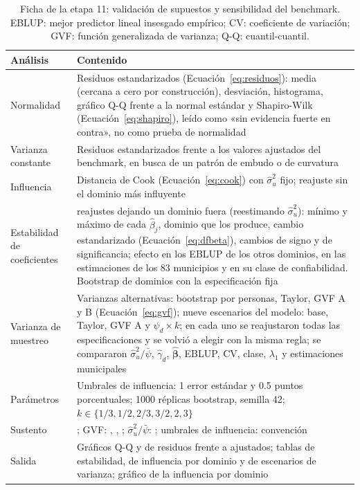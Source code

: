 \begin{table}[!htbp]
\centering
\small
\caption[Ficha de la etapa 11: validación de supuestos y sensibilidad del benchmark]{Ficha de la etapa 11: validación de supuestos y sensibilidad del benchmark. EBLUP: mejor predictor lineal insesgado empírico; CV: coeficiente de variación; GVF: función generalizada de varianza; Q-Q: cuantil-cuantil.}
\label{tab:met_supuestos}
\renewcommand{\arraystretch}{1.15}
\begin{tabularx}{\linewidth}{>{\raggedright\arraybackslash}p{2.8cm} >{\raggedright\arraybackslash}X}
\toprule
Análisis & Contenido \\
\midrule
Normalidad & Residuos estandarizados (Ecuación~\ref{eq:residuos}): media (cercana a cero por construcción), desviación, histograma, gráfico Q-Q frente a la normal estándar y Shapiro-Wilk (Ecuación~\ref{eq:shapiro}), leído como «sin evidencia fuerte en contra», no como prueba de normalidad \\
Varianza constante & Residuos estandarizados frente a los valores ajustados del benchmark, en busca de un patrón de embudo o de curvatura \\
Influencia & Distancia de Cook (Ecuación~\ref{eq:cook}) con $\hat{\sigma}_u^2$ fijo; reajuste sin el dominio más influyente \\
Estabilidad de coeficientes & 23 reajustes dejando un dominio fuera (reestimando $\hat{\sigma}_u^2$): mínimo y máximo de cada $\hat{\beta}_j$, dominio que los produce, cambio estandarizado (Ecuación~\ref{eq:dfbeta}), cambios de signo y de significancia; efecto en los EBLUP de los otros dominios, en las estimaciones de los 83 municipios y en su clase de confiabilidad. Bootstrap de dominios con la especificación fija \\
Varianza de muestreo & Varianzas alternativas: bootstrap por personas, Taylor, GVF A y B (Ecuación~\ref{eq:gvf}); nueve escenarios del modelo: base, Taylor, GVF A y $\psi_d \times k$; en cada uno se reajustaron todas las especificaciones y se volvió a elegir con la misma regla; se compararon $\hat{\sigma}_u^2/\bar{\psi}$, $\hat{\gamma}_d$, $\hat{\boldsymbol{\beta}}$, EBLUP, CV, clase, $\lambda_1$ y estimaciones municipales \\
Parámetros & Umbrales de influencia: 1 error estándar y 0.5 puntos porcentuales; \num{1000} réplicas bootstrap, semilla 42; $k \in \{1/3, 1/2, 2/3, 3/2, 2, 3\}$ \\
Sustento & \cite{ShapiroWilk1965, Cook1977}; GVF: \cite[p.~427]{morales2021smallarea}, \cite[pp.~15--16]{MarinTralmaGuerrero2024}, \cite[p.~15]{Tellez2020}; $\hat{\sigma}_u^2/\bar{\psi}$: \cite[p.~143]{Benedetti2024}; umbrales de influencia: convención \\
Salida & Gráficos Q-Q y de residuos frente a ajustados; tablas de estabilidad, de influencia por dominio y de escenarios de varianza; gráfico de la influencia por dominio \\
\bottomrule
\end{tabularx}
\end{table}

